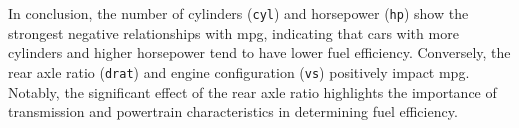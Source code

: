 \documentclass[11pt]{article}\usepackage[]{graphicx}\usepackage[]{xcolor}
\begin{document}
In conclusion, the number of cylinders (\texttt{cyl}) and horsepower (\texttt{hp}) show the strongest negative relationships with mpg, indicating that cars with more cylinders and higher horsepower tend to have lower fuel efficiency. Conversely, the rear axle ratio (\texttt{drat}) and engine configuration (\texttt{vs}) positively impact mpg. Notably, the significant effect of the rear axle ratio highlights the importance of transmission and powertrain characteristics in determining fuel efficiency.
\end{document}
